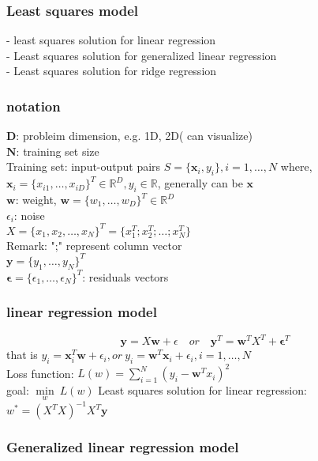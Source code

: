 \documentclass{article}
\begin{document}
		\subsubsection*{Least squares model}
			- least squares solution for linear regression\\
			- Least squares solution for generalized linear regression\\
			- Least squares solution for  ridge regression

		\subsubsection*{notation}
			$\bm{D}$: probleim dimension, e.g. 1D, 2D( can visualize)\\
			$\bm N$: training set size\\
			Training set: input-output pairs $S=\{\bm x_{i},y_{i}\},i=1,\dots,N $ where,$\bm x_{i}=\{x_{i1},\dots,x_{iD}\}^{T}\in \mathbb{R}^{D},y_{i}\in \mathbb{R}$, generally can be $\bm x$\\
			$\bm w$: weight, $\bm w=\{w_{1},\dots,w_{D}\}^{T}\in \mathbb{R}^{D}$\\
			$\epsilon_{i}$: noise \\
			$X=\{ {x_{1}, x_{2}, \dots, x_{N}} \}^{T} = \{ {x_{1}^{T}; x_{2}^{T}; \dots; x_{N}^{T}} \}$\\
			Remark: ";" represent column vector\\
			$\bm y=\{y_{1},\dots,y_{N}\}^{T}$\\
			$\bm \epsilon=\{\epsilon_{1},\dots,\epsilon_{N} \}^{T}$: residuals vectors

		\subsubsection*{linear regression model}
			$$
			\bm y=X\bm w+\epsilon
			\quad  or \quad \bm y^{T}=\bm w^{T}X^{T}+\bm \epsilon^{T}
			$$
			that is $y_{i}=\bm x_{i}^{T} \bm w +\epsilon_{i}, or \ y_{i}=\bm w^{T}\bm x_{i}+\epsilon_{i},i=1,\dots,N$\\
			Loss function: $L(w)=\sum_{i=1}^{N}(y_{i}-\bm w^{T}x_{i})^{2}$\\
			goal: $\min\limits_{w} \  L(w)$
			Least squares solution for linear regression: $w^{*}=(X^{T}X)^{-1} X^{T}\bm y$

		\subsubsection*{Generalized linear regression model}
\end{document}

